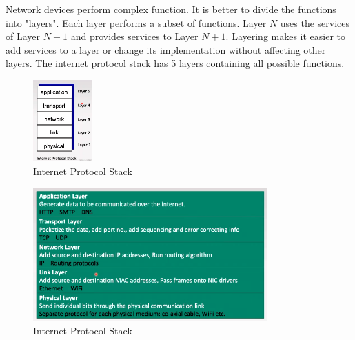 \documentclass[a4paper]{article}
\theoremstyle{plain}
\theoremstyle{definition}
\newtheorem{defn}{Definition}[section]
\theoremstyle{remark}
\begin{document}
\begin{tcolorbox}[colback=black!3!white,colframe=black!60!white,title=\begin{defn}Design Philosophy Layering \label{Design Philosophy Layering}\end{defn}]
Network devices perform complex function. It is better to divide the functions into "layers". Each layer performs a subset of functions. Layer $N$ uses the services of Layer $N-1$ and provides services to Layer $N+1$. Layering makes it easier to add services to a layer or change its implementation without affecting other layers. The internet protocol stack has 5 layers containing all possible functions.
\begin{figure}[H]
	\centering
	\includegraphics[width=0.2\textwidth]{twentytwo.png}
	\caption{Internet Protocol Stack}
	\label{fig:twentytwo-png}
\end{figure}
\begin{figure}[H]
	\centering
	\includegraphics[width=0.8\textwidth]{twentythree.png}
	\caption{Internet Protocol Stack}
	\label{fig:twentythree-png}
\end{figure}
\end{tcolorbox}
\end{document}
